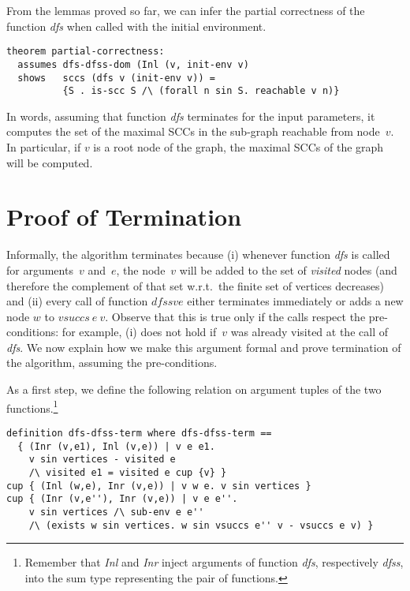 \documentclass[sigplan,10pt,anonymous,review]{acmart}
\newcommand{\prog}[1]{\textit{#1}}
\begin{document}
From the lemmas proved so far, we can infer the partial correctness of the function \prog{dfs} when called with the initial environment.

\begin{small}
\begin{lstlisting}[language=isabelle]
theorem partial-correctness:
  assumes dfs-dfss-dom (Inl (v, init-env v)
  shows   sccs (dfs v (init-env v)) = 
          {S . is-scc S /\ (forall n sin S. reachable v n)}
\end{lstlisting}
\end{small}

In words, assuming that function \prog{dfs} terminates for the input parameters, it computes the set of the maximal SCCs in the sub-graph reachable from node~$v$. In particular, if $v$ is a root node of the graph, the maximal SCCs of the graph will be computed.



\section{Proof of Termination}
\label{sec:termination}

Informally, the algorithm terminates because (i) whenever function \prog{dfs} is called for arguments~$v$ and~$e$, the node~$v$ will be added to the set of \prog{visited} nodes (and therefore the complement of that set w.r.t.\ the finite set of vertices decreases) and (ii) every call of function $\prog{dfss} v e$ either terminates immediately or adds a new node $w$ to $\prog{vsuccs}~e~v$. Observe that this is true only if the calls respect the pre-conditions: for example, (i) does not hold if~$v$ was already visited at the call of \prog{dfs}. We now explain how we make this argument formal and prove termination of the algorithm, assuming the pre-conditions.

As a first step, we define the following relation on argument tuples of the two functions.\footnote{Remember that \prog{Inl} and \prog{Inr} inject arguments of function \prog{dfs}, respectively \prog{dfss}, into the sum type representing the pair of functions.}

\begin{small}
\begin{lstlisting}[language=isabelle]
definition dfs-dfss-term where dfs-dfss-term ==
  { (Inr (v,e1), Inl (v,e)) | v e e1.
    v sin vertices - visited e 
    /\ visited e1 = visited e cup {v} }
cup { (Inl (w,e), Inr (v,e)) | v w e. v sin vertices }
cup { (Inr (v,e''), Inr (v,e)) | v e e''.
    v sin vertices /\ sub-env e e''
    /\ (exists w sin vertices. w sin vsuccs e'' v - vsuccs e v) }
\end{lstlisting}
\end{small}
\end{document}
